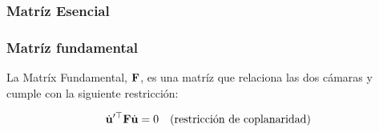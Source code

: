 \begin{frame}
    \frametitle{Matríz Esencial}


\end{frame}


\begin{frame}
    \frametitle{Matríz fundamental}
    \footnotesize

    La Matríx Fundamental, $\boldsymbol{\mathbf{F}}$,  es una matríz que relaciona las dos cámaras y cumple con la siguiente restricción:

    
    \begin{equation*}
        \dot{\boldsymbol{\mathbf{u}}}^{\prime\top} \boldsymbol{\mathbf{F}} \dot{\boldsymbol{\mathbf{u}}} = 0 \quad \text{(restricción de coplanaridad)}
    \end{equation*}
    
\end{frame}



